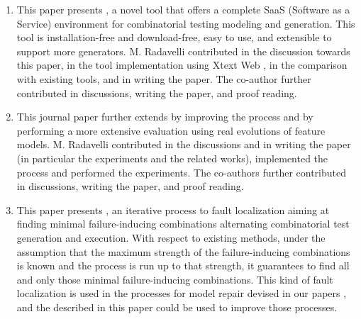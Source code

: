 \begin{enumerate}
	\item \cite{IWCTGargantini2018} 
	
	This paper presents \ctwedge, a novel tool that offers a complete SaaS (Software as a Service) environment for combinatorial testing modeling and generation. This tool is installation-free and download-free, easy to use, and extensible to support more generators.
	M. Radavelli contributed in the discussion towards this paper, in the tool implementation using Xtext Web \cite{Eysholdt:2010,xtext}, in the comparison with existing tools, and in writing the paper.
	The co-author further contributed in discussions, writing the paper, and proof reading.

	\item \cite{arcaini2019achieving} 	
	
	This journal paper further extends \cite{arcaini_evolutionary_2018} by improving the process and by performing a more extensive evaluation using real evolutions of feature models.
	M. Radavelli contributed in the discussions and in writing the paper (in particular the experiments and the related works), implemented the process and performed the experiments.
	The co-authors further contributed in discussions, writing the paper, and proof reading.
	
	\item \cite{iwct19} 

	This paper presents \mix, an iterative process to fault localization aiming at finding minimal failure-inducing combinations alternating combinatorial test generation and execution. With respect to existing methods, under the assumption that the maximum strength of the failure-inducing combinations is known and the process is run up to that strength, it guarantees to find all and only those minimal failure-inducing combinations.
	This kind of fault localization is used in the processes for model repair devised in our papers \cite{gargantini_combinatorial_2017,IWCTGargantini2018,garn2019}, and the 
	described in this paper could be used to improve those processes.
	
	
		

\end{enumerate}
